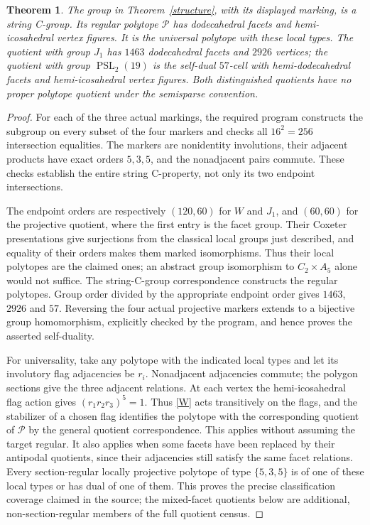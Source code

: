 \documentclass[11pt,a4paper]{article}
\newtheorem{theorem}{Theorem}\newtheorem{lemma}[theorem]{Lemma}
\newcommand{\PSL}{\operatorname{PSL}}\newcommand{\Aut}{\operatorname{Aut}}
\begin{document}
\begin{theorem}\label{geometry}
The group in Theorem~\ref{structure}, with its displayed marking, is a string C-group. Its regular polytope $\mathcal P$ has dodecahedral facets and hemi-icosahedral vertex figures. It is the universal polytope with these local types. The quotient with group $J_1$ has $1463$ dodecahedral facets and $2926$ vertices; the quotient with group $\PSL_2(19)$ is the self-dual $57$-cell with hemi-dodecahedral facets and hemi-icosahedral vertex figures. Both distinguished quotients have no proper polytope quotient under the semisparse convention.
\end{theorem}
\begin{proof}
For each of the three actual markings, the required program constructs the subgroup on every subset of the four markers and checks all $16^2=256$ intersection equalities. The markers are nonidentity involutions, their adjacent products have exact orders $5,3,5$, and the nonadjacent pairs commute. These checks establish the entire string C-property, not only its two endpoint intersections.

The endpoint orders are respectively $(120,60)$ for $W$ and $J_1$, and $(60,60)$ for the projective quotient, where the first entry is the facet group. Their Coxeter presentations give surjections from the classical local groups just described, and equality of their orders makes them marked isomorphisms. Thus their local polytopes are the claimed ones; an abstract group isomorphism to $C_2\times A_5$ alone would not suffice. The string-C-group correspondence constructs the regular polytopes. Group order divided by the appropriate endpoint order gives $1463$, $2926$ and $57$. Reversing the four actual projective markers extends to a bijective group homomorphism, explicitly checked by the program, and hence proves the asserted self-duality.

For universality, take any polytope with the indicated local types and let its involutory flag adjacencies be $r_i$. Nonadjacent adjacencies commute; the polygon sections give the three adjacent relations. At each vertex the hemi-icosahedral flag action gives $(r_1r_2r_3)^5=1$. Thus \eqref{W} acts transitively on the flags, and the stabilizer of a chosen flag identifies the polytope with the corresponding quotient of $\mathcal P$ by the general quotient correspondence. This applies without assuming the target regular. It also applies when some facets have been replaced by their antipodal quotients, since their adjacencies still satisfy the same facet relations. Every section-regular locally projective polytope of type $\{5,3,5\}$ is of one of these local types or has dual of one of them. This proves the precise classification coverage claimed in the source; the mixed-facet quotients below are additional, non-section-regular members of the full quotient census.


\end{proof}
\end{document}
